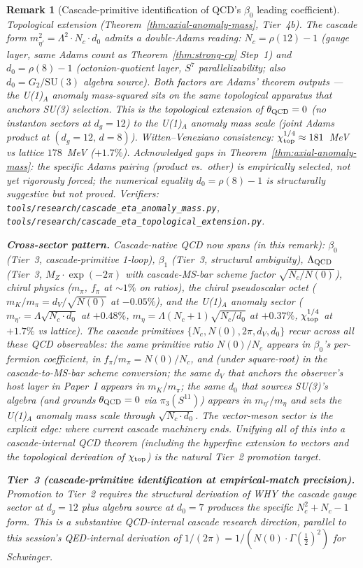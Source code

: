 \documentclass[12pt,a4paper]{article}
\newtheorem*{remark}{Remark}
\begin{document}
\begin{remark}[Cascade-primitive identification of QCD's $\beta_0$ leading coefficient]
\emph{Topological extension (Theorem~\ref{thm:axial-anomaly-mass},
Tier~4b).} The cascade form $m_{\eta'}^2 = \Lambda^2 \cdot N_c \cdot d_0$
admits a \emph{double-Adams} reading: $N_c = \rho(12)-1$ (gauge layer,
same Adams count as Theorem~\ref{thm:strong-cp} Step~1) and
$d_0 = \rho(8)-1$ (octonion-quotient layer, $S^7$ parallelizability;
also $d_0 = G_2/\mathrm{SU}(3)$ algebra source). Both factors are
Adams' theorem outputs --- the U(1)$_{\!A}$ anomaly mass-squared sits
on the same topological apparatus that anchors SU(3) selection.
This is the topological extension of $\theta_{\rm QCD}=0$ (no instanton
sectors at $d_g=12$) to the U(1)$_{\!A}$ anomaly mass scale (joint
Adams product at $(d_g=12,\,d=8)$). Witten--Veneziano consistency:
$\chi_{\rm top}^{1/4} \approx 181$~MeV vs lattice $178$~MeV ($+1.7\%$).
Acknowledged gaps in Theorem~\ref{thm:axial-anomaly-mass}: the
specific Adams pairing (product vs.\ other) is empirically selected,
not yet rigorously forced; the numerical equality $d_0 = \rho(8)-1$
is structurally suggestive but not proved. Verifiers:
\texttt{tools/research/cascade\_eta\_anomaly\_mass.py},
\texttt{tools/research/cascade\_eta\_topological\_extension.py}.

\medskip\noindent\textbf{Cross-sector pattern.} Cascade-native QCD now
spans (in this remark): $\beta_0$ (Tier~3, cascade-primitive 1-loop),
$\beta_1$ (Tier~3, structural ambiguity), $\Lambda_{\rm QCD}$ (Tier~3,
$M_Z\cdot\exp(-2\pi)$ with cascade-MS-bar scheme factor
$\sqrt{N_c/N(0)}$), chiral physics ($m_\pi$, $f_\pi$ at $\sim 1\%$
on ratios), the chiral pseudoscalar octet ($m_K/m_\pi = d_V/\sqrt{N(0)}$
at $-0.05\%$), and the U(1)$_{\!A}$ anomaly sector ($m_{\eta'} =
\Lambda\sqrt{N_c\cdot d_0}$ at $+0.48\%$, $m_\eta = \Lambda(N_c+1)\sqrt{N_c/d_0}$
at $+0.37\%$, $\chi_{\rm top}^{1/4}$ at $+1.7\%$ vs lattice).
The cascade primitives $\{N_c, N(0), 2\pi, d_V, d_0\}$ recur across
\emph{all} these QCD observables: the same primitive ratio $N(0)/N_c$
appears in $\beta_0$'s per-fermion coefficient, in
$f_\pi/m_\pi = N(0)/N_c$, and (under square-root) in the
cascade-to-MS-bar scheme conversion; the same $d_V$ that anchors
the observer's host layer in Paper~I appears in $m_K/m_\pi$;
the same $d_0$ that sources SU(3)'s algebra (and grounds
$\theta_{\rm QCD}=0$ via $\pi_3(S^{11})$) appears in
$m_{\eta'}/m_\eta$ \emph{and} sets the U(1)$_{\!A}$ anomaly mass
scale through $\sqrt{N_c\cdot d_0}$. The vector-meson sector is the
explicit edge: where current cascade machinery ends. Unifying all
of this into a cascade-internal QCD theorem (including the hyperfine
extension to vectors and the topological derivation of
$\chi_{\rm top}$) is the natural Tier~2 promotion target.

\medskip\noindent\textbf{Tier~3 (cascade-primitive identification at
empirical-match precision).} Promotion to Tier~2 requires the
structural derivation of WHY the cascade gauge sector at $d_g = 12$
plus algebra source at $d_0 = 7$ produces the specific
$N_c^2 + N_c - 1$ form. This is a substantive QCD-internal cascade
research direction, parallel to this session's QED-internal derivation
of $1/(2\pi) = 1/(N(0)\cdot\Gamma(\tfrac{1}{2})^2)$ for Schwinger.
\end{remark}
\end{document}
